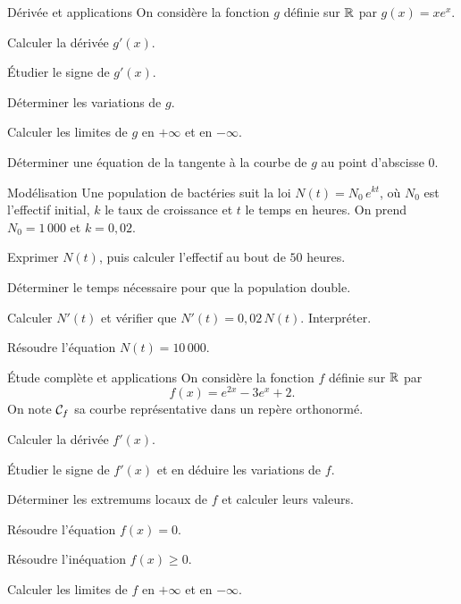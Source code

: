 \begin{exercice}[2]{Dérivée et applications}
On considère la fonction $g$ définie sur $\mathbb{R}$ par $g(x)=xe^{x}$.
\begin{questions}
  \item Calculer la dérivée $g'(x)$.
  \item Étudier le signe de $g'(x)$.
  \item Déterminer les variations de $g$.
  \item Calculer les limites de $g$ en $+\infty$ et en $-\infty$.
  \item Déterminer une équation de la tangente à la courbe de $g$ au point d'abscisse $0$.
\end{questions}
\end{exercice}

\begin{exercice}[2]{Modélisation}
Une population de bactéries suit la loi $N(t)=N_0\,e^{kt}$, où $N_0$ est l'effectif initial, $k$ le taux de croissance et $t$
le temps en heures. On prend $N_0=1\,000$ et $k=0{,}02$.
\begin{questions}
  \item Exprimer $N(t)$, puis calculer l'effectif au bout de $50$ heures.
  \item Déterminer le temps nécessaire pour que la population double.
  \item Calculer $N'(t)$ et vérifier que $N'(t)=0{,}02\,N(t)$. Interpréter.
  \item Résoudre l'équation $N(t)=10\,000$.
\end{questions}
\end{exercice}


\begin{exercice}[2]{Étude complète et applications}
On considère la fonction $f$ définie sur $\mathbb{R}$ par
\[
  f(x)=e^{2x}-3e^{x}+2 .
\]
On note $\mathcal{C}_f$ sa courbe représentative dans un repère orthonormé.
\begin{questions}
  \item Calculer la dérivée $f'(x)$.
  \item Étudier le signe de $f'(x)$ et en déduire les variations de $f$.
  \item Déterminer les extremums locaux de $f$ et calculer leurs valeurs.
  \item Résoudre l'équation $f(x)=0$.
  \item Résoudre l'inéquation $f(x)\geq0$.
  \item Calculer les limites de $f$ en $+\infty$ et en $-\infty$.
\end{questions}
\end{exercice}

